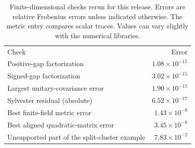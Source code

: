 \begin{table}[ht]
\caption{Finite-dimensional checks rerun for this release. Errors are relative
Frobenius errors unless indicated otherwise. The metric entry compares scalar
traces. Values can vary slightly with the numerical libraries.}\label{tab:verification}
\begin{ruledtabular}\begin{tabular}{lr}
Check & Error\\
Positive-gap factorization & $1.08\times10^{-15}$\\
Signed-gap factorization & $3.02\times10^{-15}$\\
Largest unitary-covariance error & $1.90\times10^{-15}$\\
Sylvester residual (absolute) & $6.52\times10^{-17}$\\
Best finite-field metric error & $1.43\times10^{-8}$\\
Best aligned quadratic-matrix error & $3.45\times10^{-8}$\\
Unsupported part of the split-cluster example & $7.83\times10^{-2}$\\

\end{tabular}\end{ruledtabular}
\end{table}
